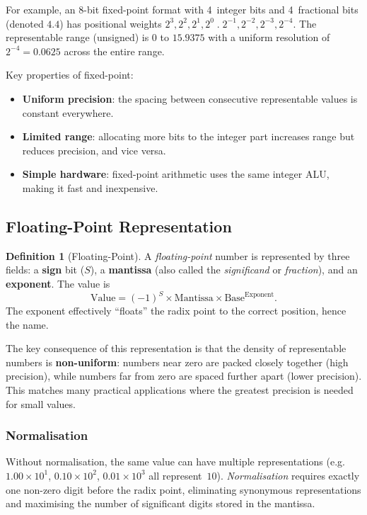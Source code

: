 \documentclass[11pt, a4paper, notitlepage]{report}
\theoremstyle{definition}
\newtheorem{definition}[theorem]{Definition}
\theoremstyle{remark}
\theoremstyle{definition}
\begin{document}
For example, an 8-bit fixed-point format with 4~integer bits and 4~fractional bits (denoted $4.4$) has positional weights $2^3, 2^2, 2^1, 2^0 \;.\; 2^{-1}, 2^{-2}, 2^{-3}, 2^{-4}$. The representable range (unsigned) is $0$ to $15.9375$ with a uniform resolution of $2^{-4} = 0.0625$ across the entire range.

Key properties of fixed-point:
\begin{itemize}
  \item \textbf{Uniform precision}: the spacing between consecutive representable values is constant everywhere.
  \item \textbf{Limited range}: allocating more bits to the integer part increases range but reduces precision, and vice versa.
  \item \textbf{Simple hardware}: fixed-point arithmetic uses the same integer ALU, making it fast and inexpensive.
\end{itemize}

\subsection{Floating-Point Representation}
\label{sec:floating-point}

\begin{definition}[Floating-Point]
  \label{def:floating-point}
  A \emph{floating-point} number is represented by three fields: a \textbf{sign} bit ($S$), a \textbf{mantissa} (also called the \emph{significand} or \emph{fraction}), and an \textbf{exponent}. The value is
  \[
    \text{Value} = (-1)^S \times \text{Mantissa} \times \text{Base}^{\text{Exponent}}.
  \]
  The exponent effectively ``floats'' the radix point to the correct position, hence the name.
\end{definition}

The key consequence of this representation is that the density of representable numbers is \textbf{non-uniform}: numbers near zero are packed closely together (high precision), while numbers far from zero are spaced further apart (lower precision). This matches many practical applications where the greatest precision is needed for small values.

\subsubsection{Normalisation}

Without normalisation, the same value can have multiple representations (e.g.\ $1.00 \times 10^{1}$, $0.10 \times 10^{2}$, $0.01 \times 10^{3}$ all represent~$10$). \emph{Normalisation} requires exactly one non-zero digit before the radix point, eliminating synonymous representations and maximising the number of significant digits stored in the mantissa.
\end{document}
